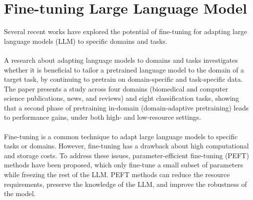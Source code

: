 \section{Fine-tuning Large Language Model}
Several recent works have explored the potential of fine-tuning for adapting large language models (LLM) to specific domains and tasks.\\\\
A research about adapting language models to domains and tasks \cite{gururangan-etal-2020-dont} investigates whether it is beneficial to tailor a pretrained language model to the domain of a target task, by continuing to pretrain on domain-specific and task-specific data. The paper presents a study across four domains (biomedical and computer science publications, news, and reviews) and eight classification tasks, showing that a second phase of pretraining in-domain (domain-adaptive pretraining) leads to performance gains, under both high- and low-resource settings.\\\\
Fine-tuning is a common technique to adapt large language models to specific tasks or domains. However, fine-tuning has a drawback about high computational and storage costs. To address these issues, parameter-efficient fine-tuning (PEFT) methods \cite{conf/icml/HoulsbyGJMLGAG19, ben-zaken-etal-2022-bitfit, li-liang-2021-prefix, hu2022lora} have been proposed, which only fine-tune a small subset of parameters while freezing the rest of the LLM. PEFT methods can reduce the resource requirements, preserve the knowledge of the LLM, and improve the robustness of the model.
